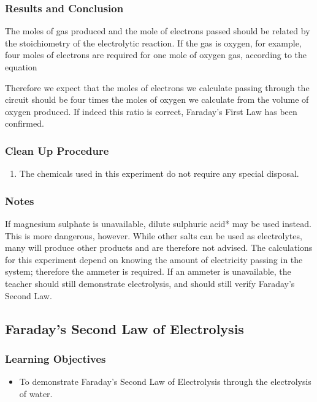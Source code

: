 \subsubsection*{Results and Conclusion}

The moles of gas produced and the mole of electrons passed should be related by the stoichiometry of the electrolytic reaction. If the gas is oxygen, for example, four moles of electrons are required for one mole of oxygen gas, according to the equation

\begin{center}
\end{center}

Therefore we expect that the moles of electrons we calculate passing through the circuit should be four times the moles of oxygen we calculate from the volume of oxygen produced. If indeed this ratio is correct, Faraday's First Law has been confirmed.

\subsubsection*{Clean Up Procedure}
\begin{enumerate}
\item{The chemicals used in this experiment do not require any special disposal.}
\end{enumerate}

\subsubsection*{Notes}
If magnesium sulphate is unavailable, dilute sulphuric acid* may be used instead. This is more dangerous, however. While other salts can be used as electrolytes, many will produce other products and are therefore not advised. The calculations for this experiment depend on knowing the amount of electricity passing in the system; therefore the ammeter is required. If an ammeter is unavailable, the teacher should still demonstrate electrolysis, and should still verify Faraday's Second Law.

\subsection{Faraday's Second Law of Electrolysis}

\subsubsection*{Learning Objectives}
\begin{itemize}
\item{To demonstrate Faraday's Second Law of Electrolysis through the electrolysis of water.}
\end{itemize}

